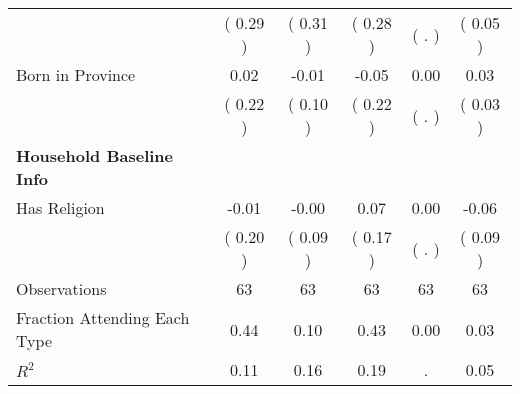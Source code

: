 \begin{table}[H]
{\begin{tabular}{lccccc}
\quad  & (     0.29 ) & (     0.31 )  & (     0.28 )  & (        . ) & (     0.05 ) \\
\quad Born in Province &      0.02 &     -0.01 &     -0.05 &      0.00 &      0.03 \\
\quad  & (     0.22 ) & (     0.10 )  & (     0.22 )  & (        . ) & (     0.03 ) \\
\midrule
\textbf{Household Baseline Info} \\
\quad Has Religion &     -0.01 &     -0.00 &      0.07 &      0.00 &     -0.06 \\
\quad  & (     0.20 ) & (     0.09 )  & (     0.17 )  & (        . ) & (     0.09 ) \\
\midrule
Observations & 63 & 63 & 63 & 63 & 63 \\
Fraction Attending Each Type &      0.44 &      0.10 &      0.43 &      0.00 &      0.03 \\
\midrule
$ R^2$ &      0.11 &      0.16 &      0.19 &         . &      0.05 \\
\bottomrule
\end{tabular}}
\end{table}
